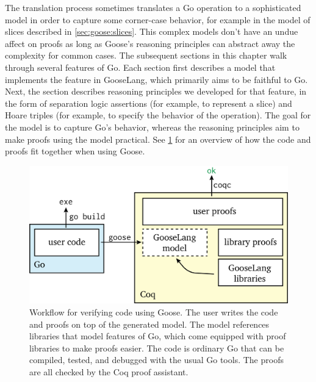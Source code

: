The translation process sometimes translates a Go operation to a sophisticated
model in order to capture some corner-case behavior, for example in the model of
slices described in \cref{sec:goose:slices}. This complex models don't have an
undue affect on proofs as long as Goose's reasoning principles can abstract away
the complexity for common cases. The subsequent sections in this chapter
walk through several features of Go. Each section first describes a model that
implements the feature in GooseLang, which primarily aims to
be faithful to Go. Next, the section describes reasoning principles we developed for that
feature, in the form of separation logic assertions (for example, to
represent a slice) and Hoare triples (for example, to specify the
behavior of the  operation). The goal for the model is to capture
Go's behavior, whereas the reasoning
principles aim to make proofs using the model practical. See
\cref{fig:goose:workflow} for an overview of how
the code and proofs fit together when using Goose.

\begin{figure}
  \includegraphics{fig/goose-proofs.png}
  \vspace{0.5\baselineskip}
  \caption[Workflow for verifying code with Goose]%
  {Workflow for verifying code using Goose. The user writes the code and
    proofs on top of the generated model. The model references libraries that
    model features of Go, which come equipped with proof libraries to make
    proofs easier. The code is ordinary Go that can be compiled, tested, and
    debugged with the usual Go tools. The proofs are all checked by the Coq
    proof assistant.}
  \label{fig:goose:workflow}
\end{figure}
